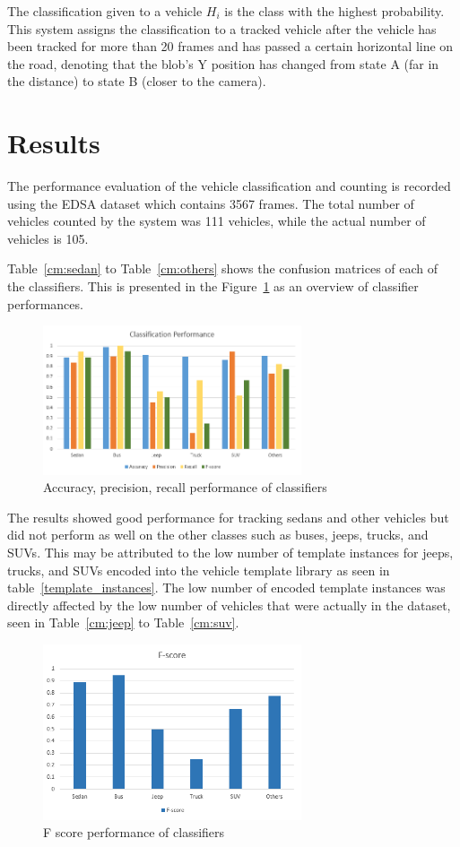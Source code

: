 \documentclass[conference]{IEEEtran}
\begin{document}
The classification given to a vehicle $H_i$ is the class with the highest probability. This system assigns the classification to a tracked vehicle after the vehicle has been tracked for more than 20 frames and has passed a certain horizontal line on the road, denoting that the blob's Y position has changed from state A (far in the distance) to state B (closer to the camera).

\section{Results}

The performance evaluation of the vehicle classification and counting is recorded using the EDSA dataset which contains 3567 frames. The total number of vehicles counted by the system was 111 vehicles, while the actual number of vehicles is 105.

Table~\ref{cm:sedan} to Table~\ref{cm:others} shows the confusion matrices of each of the classifiers. This is presented in the Figure~\ref{fig_classifier_performance} as an overview of classifier performances.

\begin{figure}[!ht]
\centering
\includegraphics[width=3in]{classification_performance.png}
\caption{Accuracy, precision, recall performance of classifiers}
\label{fig_classifier_performance}
\end{figure}

The results showed good performance for tracking sedans and other vehicles but did not perform as well on the other classes such as buses, jeeps, trucks, and SUVs. This may be attributed to the low number of template instances for jeeps, trucks, and SUVs encoded into the vehicle template library as seen in table~\ref{template_instances}. The low number of encoded template instances was directly affected by the low number of vehicles that were actually in the dataset, seen in Table~\ref{cm:jeep} to Table~\ref{cm:suv}.

\begin{figure}[!ht]
\centering
\includegraphics[width=3in]{Fscore.png}
\caption{F score performance of classifiers}
\label{fig_fscore_performance}
\end{figure}
\end{document}
